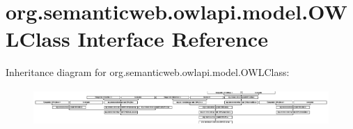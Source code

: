 \hypertarget{interfaceorg_1_1semanticweb_1_1owlapi_1_1model_1_1_o_w_l_class}{\section{org.\-semanticweb.\-owlapi.\-model.\-O\-W\-L\-Class Interface Reference}
\label{interfaceorg_1_1semanticweb_1_1owlapi_1_1model_1_1_o_w_l_class}
}
Inheritance diagram for org.\-semanticweb.\-owlapi.\-model.\-O\-W\-L\-Class\-:\begin{figure}[H]
\begin{center}
\leavevmode
\includegraphics[height=1.373992cm]{interfaceorg_1_1semanticweb_1_1owlapi_1_1model_1_1_o_w_l_class}
\end{center}
\end{figure}
